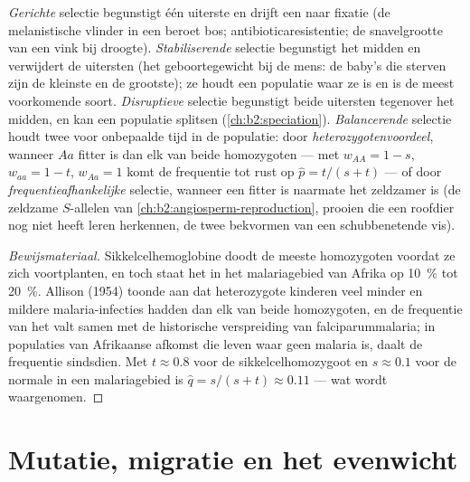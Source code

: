 \begin{proposition}\label{prop:b2:population-genetics:kinds}
\emph{Gerichte} selectie begunstigt één uiterste en drijft een  naar
fixatie (de melanistische vlinder in een beroet bos; antibioticaresistentie;
de snavelgrootte van een vink bij droogte). \emph{Stabiliserende} selectie
begunstigt het midden en verwijdert de uitersten (het geboortegewicht bij de
mens: de baby's die sterven zijn de kleinste en de grootste); ze houdt een
populatie waar ze is en is de meest voorkomende soort. \emph{Disruptieve}
selectie begunstigt beide uitersten tegenover het midden, en kan een populatie
splitsen (\cref{ch:b2:speciation}). \emph{Balancerende} selectie houdt twee
 voor onbepaalde tijd in de populatie: door \emph{heterozygotenvoordeel},
wanneer $Aa$ fitter is dan elk van beide homozygoten --- met
$w_{AA} = 1 - s$, $w_{aa} = 1 - t$, $w_{Aa} = 1$ komt de frequentie
tot rust op $\hat p = t/(s + t)$ --- of door \emph{frequentieafhankelijke}
selectie, wanneer een  fitter is naarmate het zeldzamer is (de
zeldzame $S$-allelen van \cref{ch:b2:angiosperm-reproduction}, prooien die
een roofdier nog niet heeft leren herkennen, de twee bekvormen van een
schubbenetende vis).
\end{proposition}
\begin{proof}[Bewijsmateriaal]
Sikkelcelhemoglobine doodt de meeste homozygoten voordat ze zich voortplanten,
en toch staat het  in het malariagebied van Afrika op \qty{10}{\%} tot
\qty{20}{\%}. Allison (1954) toonde aan dat heterozygote kinderen veel minder
en mildere malaria-infecties hadden dan elk van beide homozygoten, en de
frequentie van het  valt samen met de historische verspreiding van
falciparummalaria; in populaties van Afrikaanse afkomst die leven waar geen
malaria is, daalt de frequentie sindsdien. Met $t \approx 0.8$ voor de
sikkelcelhomozygoot en $s \approx 0.1$ voor de normale  in een
malariagebied is $\hat q = s/(s + t) \approx 0.11$ --- wat wordt waargenomen.
\end{proof}

\section{Mutatie, migratie en het evenwicht}

